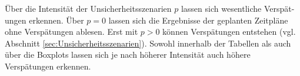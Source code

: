 \vspace*{-25px}
\begin{figure}[H]
\end{figure}

Über die Intensität der Unsicherheitsszenarien $p$ lassen sich wesentliche Verspät-ungen erkennen. Über $p = 0$ lassen sich die Ergebnisse der geplanten Zeitpläne ohne Verspätungen ablesen. Erst mit $p > 0$ können Verspätungen entstehen (vgl. Abschnitt \ref{sec:Unsicherheitsszenarien}). Sowohl innerhalb der Tabellen als auch über die Boxplots lassen sich je nach höherer Intensität auch höhere Verspätungen erkennen. 
